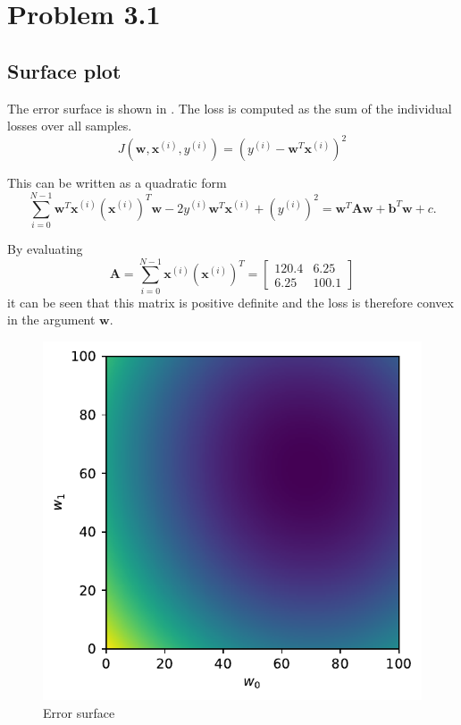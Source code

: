 \documentclass[12pt,a4paper]{scrartcl}
\newcommand{\matr}[1]{\mathbf{#1}}
\begin{document}
	
	\section*{Problem 3.1}
	
	\subsection*{Surface plot}
	
	The error surface is shown in . 
	The loss is computed as the sum of the individual losses over all samples.
	\begin{equation}
		J\left(\matr{w}, \matr{x}^{(i)}, y^{(i)}\right) = \left(y^{(i)} - \matr{w}^T\matr{x}^{(i)} \right)^2 \label{eq:ex3_1_loss}
	\end{equation}
	
	This can be written as a quadratic form
	\begin{equation}
		\sum_{i=0}^{N-1} \matr{w}^T \matr{x}^{(i)} \left(\matr{x}^{(i)}\right)^T \matr{w} - 2y^{(i)} \matr{w}^T\matr{x}^{(i)} + \left(y^{(i)}\right)^2 = \matr{w}^T \matr{A}\matr{w} +\matr{b}^T\matr{w}+c.
	\end{equation}

	By evaluating 
	\begin{equation}
		\matr{A} = \sum_{i=0}^{N-1} \matr{x}^{(i)} \left(\matr{x}^{(i)}\right)^T = \begin{bmatrix}
			\num{120.4} & \num{6.25} \\ \num{6.25} & \num{100.1}
		\end{bmatrix}
	\end{equation}
	it can be seen that this matrix is positive definite and the loss is therefore convex in the argument $\matr{w}$.
	
	\begin{figure}[H]
		\centering	\includegraphics[width=0.65\linewidth]{figs/ex3_1_surf.pdf}
		\caption{Error surface}
		\label{fig:ex3_1_err_surface}
	\end{figure}
	
\end{document}
